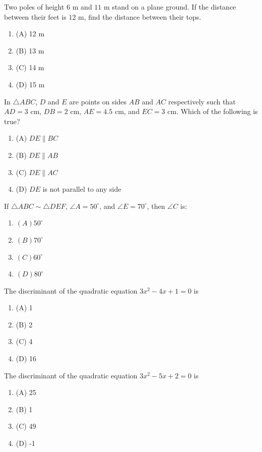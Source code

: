 \documentclass[12pt,a4paper]{exam}
\begin{document}
\begin{questions}
\question[1] Two poles of height $6$ m and $11$ m stand on a plane ground. If the distance between their feet is $12$ m, find the distance between their tops.
\begin{enumerate}[label=(\Alph*)]
  \item (A) 12 m
  \item (B) 13 m
  \item (C) 14 m
  \item (D) 15 m
\end{enumerate}
\vspace{0.15cm}

\question[1] In $\triangle ABC$, $D$ and $E$ are points on sides $AB$ and $AC$ respectively such that $AD = 3$ cm, $DB = 2$ cm, $AE = 4.5$ cm, and $EC = 3$ cm. Which of the following is true?
\begin{enumerate}[label=(\Alph*)]
  \item (A) $DE \parallel BC$
  \item (B) $DE \parallel AB$
  \item (C) $DE \parallel AC$
  \item (D) $DE$ is not parallel to any side
\end{enumerate}
\vspace{0.15cm}

\question[1] If $\triangle ABC \sim \triangle DEF$, $\angle A = 50^\circ$, and $\angle E = 70^\circ$, then $\angle C$ is:
\begin{enumerate}[label=(\Alph*)]
  \item $(A) 50^\circ$
  \item $(B) 70^\circ$
  \item $(C) 60^\circ$
  \item $(D) 80^\circ$
\end{enumerate}
\vspace{0.15cm}

\question[1] The discriminant of the quadratic equation $3x^2 - 4x + 1 = 0$ is
\begin{enumerate}[label=(\Alph*)]
  \item (A) 1
  \item (B) 2
  \item (C) 4
  \item (D) 16
\end{enumerate}
\vspace{0.15cm}

\question[1] The discriminant of the quadratic equation $3x^2 - 5x + 2 = 0$ is
\begin{enumerate}[label=(\Alph*)]
  \item (A) 25
  \item (B) 1
  \item (C) 49
  \item (D) -1
\end{enumerate}
\vspace{0.15cm}


\end{questions}
\end{document}
